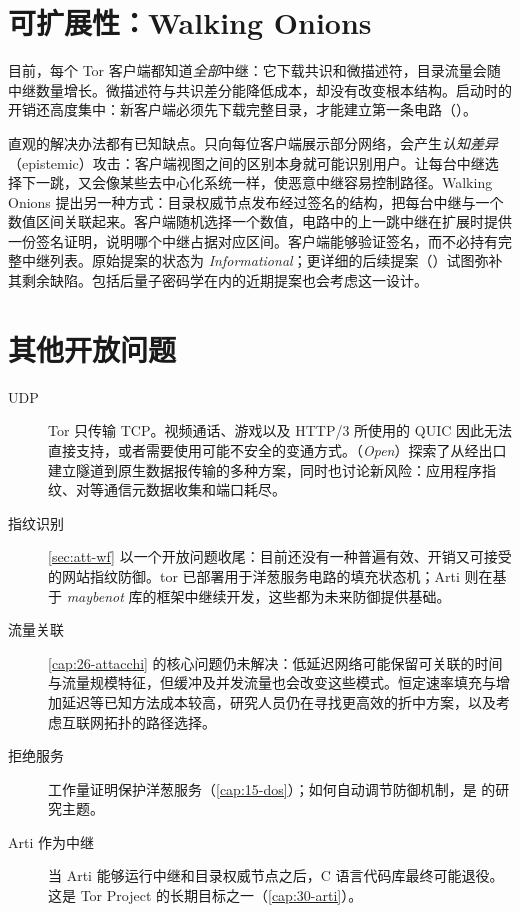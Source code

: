 \section{可扩展性：Walking Onions}\label{sec:fut-walking}

目前，每个 Tor 客户端都知道\emph{全部}中继：它下载共识和微描述符，目录流量会随中继数量增长。微描述符与共识差分能降低成本，却没有改变根本结构。启动时的开销还高度集中：新客户端必须先下载完整目录，才能建立第一条电路（）。

直观的解决办法都有已知缺点。只向每位客户端展示部分网络，会产生\emph{认知差异}（epistemic）攻击：客户端视图之间的区别本身就可能识别用户。让每台中继选择下一跳，又会像某些去中心化系统一样，使恶意中继容易控制路径。Walking Onions 提出另一种方式：目录权威节点发布经过签名的结构，把每台中继与一个数值区间关联起来。客户端随机选择一个数值，电路中的上一跳中继在扩展时提供一份签名证明，说明哪个中继占据对应区间。客户端能够验证签名，而不必持有完整中继列表。原始提案的状态为 \emph{Informational}；更详细的后续提案（）试图弥补其剩余缺陷。包括后量子密码学在内的近期提案也会考虑这一设计。

\section{其他开放问题}\label{sec:fut-altri}

\begin{description}
  \item[UDP] Tor 只传输 TCP。视频通话、游戏以及 HTTP/3 所使用的 QUIC 因此无法直接支持，或者需要使用可能不安全的变通方式。（\emph{Open}）探索了从经出口建立隧道到原生数据报传输的多种方案，同时也讨论新风险：应用程序指纹、对等通信元数据收集和端口耗尽。
  \item[指纹识别] \cref{sec:att-wf} 以一个开放问题收尾：目前还没有一种普遍有效、开销又可接受的网站指纹防御。tor 已部署用于洋葱服务电路的填充状态机；Arti 则在基于 \emph{maybenot} 库的框架中继续开发，这些都为未来防御提供基础。
  \item[流量关联] \cref{cap:26-attacchi} 的核心问题仍未解决：低延迟网络可能保留可关联的时间与流量规模特征，但缓冲及并发流量也会改变这些模式。恒定速率填充与增加延迟等已知方法成本较高，研究人员仍在寻找更高效的折中方案，以及考虑互联网拓扑的路径选择。
  \item[拒绝服务] 工作量证明保护洋葱服务（\cref{cap:15-dos}）；如何自动调节防御机制，是  的研究主题。
  \item[Arti 作为中继] 当 Arti 能够运行中继和目录权威节点之后，C 语言代码库最终可能退役。这是 Tor Project 的长期目标之一（\cref{cap:30-arti}）。
\end{description}

